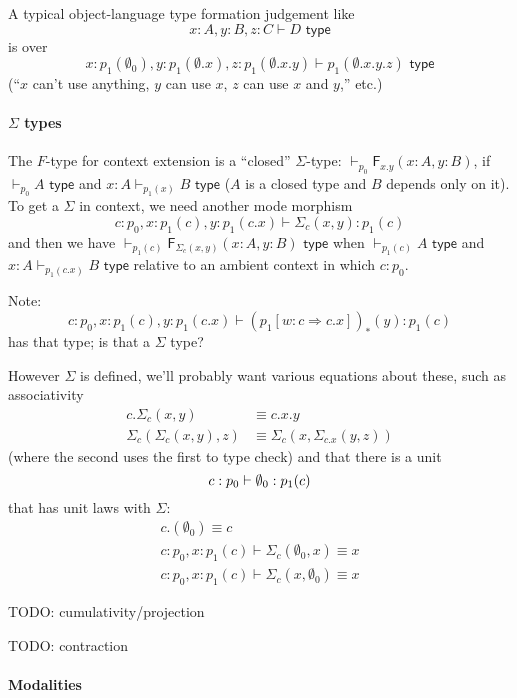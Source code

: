 \documentclass[10pt]{article}
\newcommand{\yields}{\vdash}
\newcommand{\type}{\,\,\mathsf{type}}
\newcommand\F[2]{\ensuremath{\mathsf{F}_{#1}(#2)}}
\begin{document}
A typical object-language type formation judgement like 
\[
x : A, y : B, z : C \vdash D \type
\]
is over
\[
x : p_1(\emptyset_0), y : p_1(\emptyset.x), z : p_1(\emptyset.x.y) \vdash p_1(\emptyset.x.y.z) \type
\]
(``$x$ can't use anything, $y$ can use $x$, $z$ can use $x$ and $y$,'' etc.) 

\paragraph{$\Sigma$ types}
The $F$-type for context extension is a ``closed'' $\Sigma$-type:
$\yields_{p_0} \F{x.y}{x : A, y : B}$, if $\yields_{p_0} A \type$ and $x
: A \vdash_{p_1(x)} B \type$ ($A$ is a closed type and $B$ depends only
on it).  To get a $\Sigma$ in context, we need another mode morphism
\[
c : p_0, x : p_1(c), y : p_1(c.x) \yields \Sigma_c(x,y) : p_1(c) 
\]
and then we have $\vdash_{p_1(c)} \F{\Sigma_c(x,y)}{x : A, y : B} \type$
when $\yields_{p_1(c)} A \type$ and $x : A \vdash_{p_1(c.x)} B \type$
relative to an ambient context in which $c : p_0$.

Note:
\[
c : p_0, x : p_1(c), y : p_1(c.x) \yields (p_1[w : c \Rightarrow c.x])_*(y) : p_1(c) 
\]
has that type; is that a $\Sigma$ type?

However $\Sigma$ is defined, we'll probably want various equations about
these, such as associativity
\begin{align*}
c.\Sigma_c(x,y) &\equiv c.x.y \\
\Sigma_c(\Sigma_c(x,y),z) & \equiv \Sigma_c(x,\Sigma_{c.x}(y,z))
\end{align*}
(where the second uses the first to type check)
and that there is a unit 
\[
c : p_0 \yields \emptyset_0 : p_1(c) \\
\]
that has unit laws with $\Sigma$:  
\begin{align*}
c.(\emptyset_0) \equiv c\\
c : p_0, x : p_1(c) \yields \Sigma_c(\emptyset_0,x) \equiv x\\
c : p_0, x : p_1(c) \yields \Sigma_c(x,\emptyset_0) \equiv x
\end{align*}

TODO: cumulativity/projection

TODO: contraction

\paragraph{Modalities}
\end{document}
